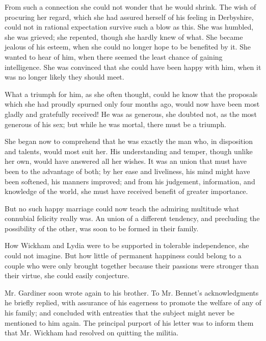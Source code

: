 From such a connection she could not wonder that he would shrink. The wish of procuring her regard, which she had assured herself of his feeling in Derbyshire, could not in rational expectation survive such a blow as this. She was humbled, she was grieved; she repented, though she hardly knew of what. She became jealous of his esteem, when she could no longer hope to be benefited by it. She wanted to hear of him, when there seemed the least chance of gaining intelligence. She was convinced that she could have been happy with him, when it was no longer likely they should meet.

What a triumph for him, as she often thought, could he know that the proposals which she had proudly spurned only four months ago, would now have been most gladly and gratefully received! He was as generous, she doubted not, as the most generous of his sex; but while he was mortal, there must be a triumph.

She began now to comprehend that he was exactly the man who, in disposition and talents, would most suit her. His understanding and temper, though unlike her own, would have answered all her wishes. It was an union that must have been to the advantage of both; by her ease and liveliness, his mind might have been softened, his manners improved; and from his judgement, information, and knowledge of the world, she must have received benefit of greater importance.

But no such happy marriage could now teach the admiring multitude what connubial felicity really was. An union of a different tendency, and precluding the possibility of the other, was soon to be formed in their family.

How Wickham and Lydia were to be supported in tolerable independence, she could not imagine. But how little of permanent happiness could belong to a couple who were only brought together because their passions were stronger than their virtue, she could easily conjecture.

Mr. Gardiner soon wrote again to his brother. To Mr. Bennet's acknowledgments he briefly replied, with assurance of his eagerness to promote the welfare of any of his family; and concluded with entreaties that the subject might never be mentioned to him again. The principal purport of his letter was to inform them that Mr. Wickham had resolved on quitting the militia.

